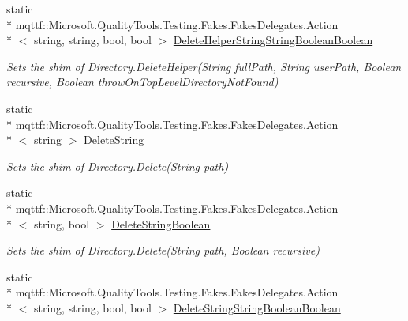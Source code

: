 \begin{DoxyCompactItemize}
static \\*
mqttf\-::\-Microsoft.\-Quality\-Tools.\-Testing.\-Fakes.\-Fakes\-Delegates.\-Action\\*
$<$ string, string, bool, bool $>$ \hyperlink{class_system_1_1_i_o_1_1_fakes_1_1_shim_directory_a7ae04acc7529cf80544eb048f6634225}{Delete\-Helper\-String\-String\-Boolean\-Boolean}
\begin{DoxyCompactList}\small\item\em Sets the shim of Directory.\-Delete\-Helper(\-String full\-Path, String user\-Path, Boolean recursive, Boolean throw\-On\-Top\-Level\-Directory\-Not\-Found)\end{DoxyCompactList}\item 
static \\*
mqttf\-::\-Microsoft.\-Quality\-Tools.\-Testing.\-Fakes.\-Fakes\-Delegates.\-Action\\*
$<$ string $>$ \hyperlink{class_system_1_1_i_o_1_1_fakes_1_1_shim_directory_a782070a7758b276c286a30b2e72fd3f1}{Delete\-String}
\begin{DoxyCompactList}\small\item\em Sets the shim of Directory.\-Delete(\-String path)\end{DoxyCompactList}\item 
static \\*
mqttf\-::\-Microsoft.\-Quality\-Tools.\-Testing.\-Fakes.\-Fakes\-Delegates.\-Action\\*
$<$ string, bool $>$ \hyperlink{class_system_1_1_i_o_1_1_fakes_1_1_shim_directory_a95d1db8e258c01b8651dead2427c2177}{Delete\-String\-Boolean}
\begin{DoxyCompactList}\small\item\em Sets the shim of Directory.\-Delete(\-String path, Boolean recursive)\end{DoxyCompactList}\item 
static \\*
mqttf\-::\-Microsoft.\-Quality\-Tools.\-Testing.\-Fakes.\-Fakes\-Delegates.\-Action\\*
$<$ string, string, bool, bool $>$ \hyperlink{class_system_1_1_i_o_1_1_fakes_1_1_shim_directory_a55ff2d54614fc2b8f23698c29ff2ac7a}{Delete\-String\-String\-Boolean\-Boolean}

\end{DoxyCompactItemize}
